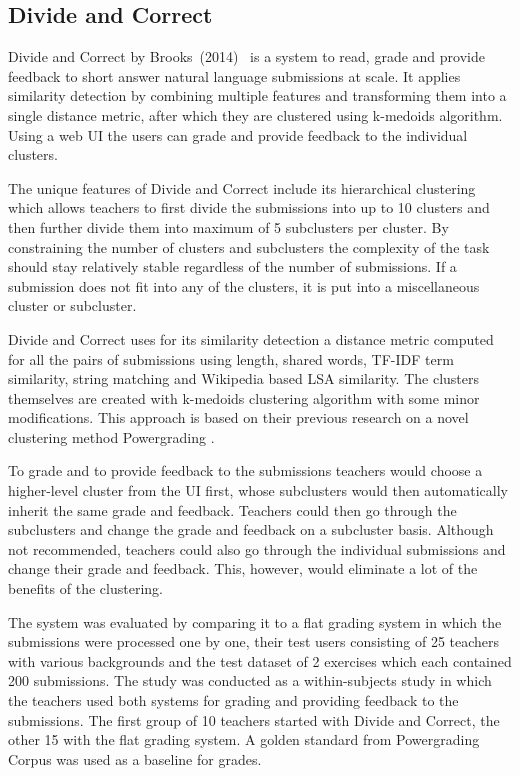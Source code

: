 \subsection{Divide and Correct}

Divide and Correct by Brooks~(2014)~\cite{divide-and-correct} is a system to read, grade and provide feedback to short answer natural language submissions at scale. It applies similarity detection by combining multiple features and transforming them into a single distance metric, after which they are clustered using k-medoids algorithm. Using a web UI the users can grade and provide feedback to the individual clusters.

The unique features of Divide and Correct include its hierarchical clustering which allows teachers to first divide the submissions into up to 10 clusters and then further divide them into maximum of 5 subclusters per cluster. By constraining the number of clusters and subclusters the complexity of the task should stay relatively stable regardless of the number of submissions. If a submission does not fit into any of the clusters, it is put into a miscellaneous cluster or subcluster.

Divide and Correct uses for its similarity detection a distance metric computed for all the pairs of submissions using length, shared words, TF-IDF term similarity, string matching and Wikipedia based LSA similarity. The clusters themselves are created with k-medoids clustering algorithm with some minor modifications. This approach is based on their previous research on a novel clustering method Powergrading \cite{basu-powergrading-2013}.

To grade and to provide feedback to the submissions teachers would choose a higher-level cluster from the UI first, whose subclusters would then automatically inherit the same grade and feedback. Teachers could then go through the subclusters and change the grade and feedback on a subcluster basis. Although not recommended, teachers could also go through the individual submissions and change their grade and feedback. This, however, would eliminate a lot of the benefits of the clustering.

The system was evaluated by comparing it to a flat grading system in which the submissions were processed one by one, their test users consisting of 25 teachers with various backgrounds and the test dataset of 2 exercises which each contained 200 submissions. The study was conducted as a within-subjects study in which the teachers used both systems for grading and providing feedback to the submissions. The first group of 10 teachers started with Divide and Correct, the other 15 with the flat grading system. A golden standard from Powergrading Corpus was used as a baseline for grades.

